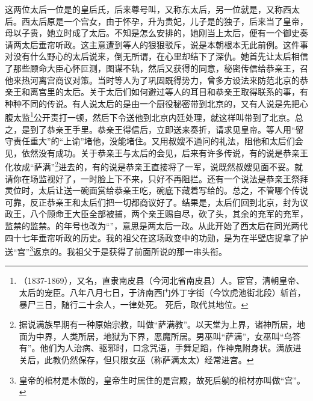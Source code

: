 这两位太后一位是的皇后氏，后来尊号叫，又称东太后，另一位就是，又称西太后。西太后原是一个宫女，由于怀孕，升为贵妃，儿子是的独子，后来当了皇帝，母以子贵，她立时成了太后。不知是怎么安排的，她刚当上太后，便有一个御史奏请两太后垂帘听政。这主意遭到等人的狠狠驳斥，说是本朝根本无此前例。这件事对没有什么野心的太后说来，倒无所谓，在心里却结下了深仇。她首先让太后相信了那些顾命大臣心怀叵测，图谋不轨，然后又获得的同意，秘密传信给恭亲王，召他来热河离宫商议对策。当时等人为了巩固既得势力，曾多方设法来防范北京的恭亲王和离宫里的太后。关于太后们如何避过等人的耳目和恭亲王取得联系的事，有种种不同的传说。有人说太后的是由一个厨役秘密带到北京的，又有人说是先把心腹太监\footnote{（1837-1869），又名，直隶南皮县（今河北省南皮县）人。宦官，清朝皇帝、太后的宠臣。八年八月七日，于济南西门外丁字街（今饮虎池街北段）斩首，暴尸三日，随行二十余人，一律处死。
死后，取代其地位。}公开责打一顿，然后下令送他到北京内廷处理，就这样叫带到了北京。总之，是到了恭亲王手里。恭亲王得信后，立即送来奏折，请求见皇帝。等人用“留守责任重大”的“上谕”堵他，没能堵住。又用叔嫂不通问的礼法，阻他和太后们会见，依然没有成功。关于恭亲王与太后的会见，后来有许多传说，有的说是恭亲王化妆成“萨满”\footnote{据说满族早期有一种原始宗教，叫做“萨满教”。以天堂为上界，诸神所居，地面为中界，人类所居，地狱为下界，恶魔所居。男巫叫“萨满”，女巫叫“乌答有”。他们为人治病、驱邪时，口念咒语，手舞足蹈，作神鬼附身状。满族进关后，此教仍然保存，但只限女巫（称萨满太太）经常进宫。}进去的，有的说是恭亲王直接将了一军，说既然叔嫂见面不妥。就请你在场监视好了，一时脸上下不来，只好不再阻拦。还有一个说法是恭亲王祭拜灵位时，太后让送一碗面赏给恭亲王吃，碗底下藏着写给的。总之，不管哪个传说可靠，反正恭亲王和太后们把一切都商议好了。结果是，太后们回到北京，封为议政王，八个顾命王大臣全部被捕，两个亲王赐自尽，砍了头，其余的充军的充军，监禁的监禁。的年号也改为“”，意思是两太后一政。从此开始了西太后在同光两代四十七年垂帘听政的历史。我的祖父在这场政变中的功勋，是为在半壁店捉拿了护送“宫”\footnote{皇帝的棺材是木做的，皇帝生时居住的是宫殿，故死后躺的棺材亦叫做“宫”。}返京的。我祖父于是获得了前面所说的那一串头衔。\\

